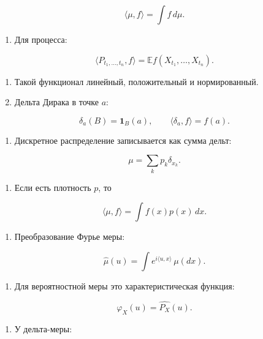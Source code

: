 \documentclass[
  11pt,
  a4paper,
]{article}
\providecommand{\tightlist}{%
  \setlength{\itemsep}{0pt}\setlength{\parskip}{0pt}}
\begin{document}
\[
\langle\mu,f\rangle=\int f\,d\mu.
\]

\begin{enumerate}
\def\labelenumi{\arabic{enumi}.}
\setcounter{enumi}{2}
\tightlist
\item
  Для процесса:
\end{enumerate}

\[
\langle P_{t_1,\ldots,t_n},f\rangle
=
\mathbb E f(X_{t_1},\ldots,X_{t_n}).
\]

\begin{enumerate}
\def\labelenumi{\arabic{enumi}.}
\setcounter{enumi}{3}
\tightlist
\item
  Такой функционал линейный, положительный и нормированный.
\item
  Дельта Дирака в точке \(a\):
\end{enumerate}

\[
\delta_a(B)=\mathbf 1_B(a),
\qquad
\langle\delta_a,f\rangle=f(a).
\]

\begin{enumerate}
\def\labelenumi{\arabic{enumi}.}
\setcounter{enumi}{5}
\tightlist
\item
  Дискретное распределение записывается как сумма дельт:
\end{enumerate}

\[
\mu=\sum_kp_k\delta_{x_k}.
\]

\begin{enumerate}
\def\labelenumi{\arabic{enumi}.}
\setcounter{enumi}{6}
\tightlist
\item
  Если есть плотность \(p\), то
\end{enumerate}

\[
\langle\mu,f\rangle=\int f(x)p(x)\,dx.
\]

\begin{enumerate}
\def\labelenumi{\arabic{enumi}.}
\setcounter{enumi}{7}
\tightlist
\item
  Преобразование Фурье меры:
\end{enumerate}

\[
\widehat\mu(u)=\int e^{i\langle u,x\rangle}\,\mu(dx).
\]

\begin{enumerate}
\def\labelenumi{\arabic{enumi}.}
\setcounter{enumi}{8}
\tightlist
\item
  Для вероятностной меры это характеристическая функция:
\end{enumerate}

\[
\varphi_X(u)=\widehat{P_X}(u).
\]

\begin{enumerate}
\def\labelenumi{\arabic{enumi}.}
\setcounter{enumi}{9}
\tightlist
\item
  У дельта-меры:
\end{enumerate}
\end{document}
